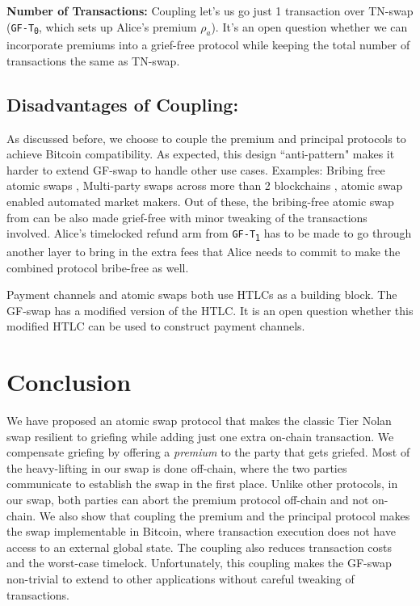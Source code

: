 \bigbreak
\noindent
\textbf{Number of Transactions:} Coupling let's us go just 1 transaction over TN-swap (\texttt{GF-T\textsubscript{0}}, which sets up Alice's premium $\rho_a$). It's an open question whether we can incorporate premiums into a grief-free protocol while keeping the total number of transactions the same as TN-swap.

\subsection{Disadvantages of Coupling:} As discussed before, we choose to couple the premium and principal protocols to achieve Bitcoin compatibility. As expected, this design ``anti-pattern" makes it harder to extend GF-swap to handle other use cases. Examples: Bribing free atomic swaps \cite{Nadahalli2021timelocked} \cite{mad_htlc}, Multi-party swaps across more than 2 blockchains \cite{herlihy2018atomic}, atomic swap enabled automated market makers. Out of these, the bribing-free atomic swap from \cite{Nadahalli2021timelocked} can be also made grief-free with minor tweaking of the transactions involved. Alice's timelocked refund arm from \texttt{GF-T\textsubscript{1}} has to be made to go through another layer to bring in the extra fees that Alice needs to commit to make the combined protocol bribe-free as well. 

Payment channels and atomic swaps both use HTLCs as a building block. The GF-swap has a modified version of the HTLC. It is an open question whether this modified HTLC can be used to construct payment channels.

\section{Conclusion}
We have proposed an atomic swap protocol that makes the classic Tier Nolan swap resilient to griefing while adding just one extra on-chain transaction. We compensate griefing by offering a \textit{premium} to the party that gets griefed. Most of the heavy-lifting in our swap is done off-chain, where the two parties communicate to establish the swap in the first place. Unlike other protocols, in our swap, both parties can abort the premium protocol off-chain and not on-chain. We also show that coupling the premium and the principal protocol makes the swap implementable in Bitcoin, where transaction execution does not have access to an external global state. The coupling also reduces transaction costs and the worst-case timelock. Unfortunately, this coupling makes the GF-swap non-trivial to extend to other applications without careful tweaking of transactions.
